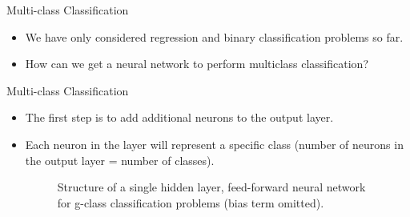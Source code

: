 








\begin{frame} {Multi-class Classification}
\vspace{20mm}
\begin{itemize}
\item We have only considered regression and binary classification problems so far.
\vspace{5mm}
\item How can we get a neural network to perform multiclass classification?
  \end{itemize}
\end{frame}

\begin{frame} {Multi-class Classification}
\begin{itemize}
\item The first step is to add additional neurons to the output layer.
\item Each neuron in the layer will represent a specific class (number of neurons in the output layer = number of classes).
\begin{figure}
\centering
{}
\caption{\footnotesize Structure of a single hidden layer, feed-forward neural network for g-class classification problems (bias term omitted).}
\end{figure}
\end{itemize}
\end{frame}

